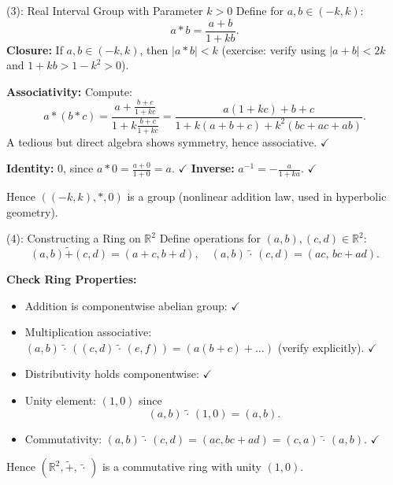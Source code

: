 \documentclass[11pt,aspectratio=43,ignorenonframetext,t]{beamer}
\begin{document}
\begin{frame}{(3): Real Interval Group with Parameter $k>0$}
Define for $a,b\in(-k,k)$:
\[
a*b=\frac{a+b}{1+kb}.
\]
\textbf{Closure:}
If $a,b\in(-k,k)$, then $|a*b|<k$ (exercise: verify using $|a+b|<2k$ and $1+kb>1-k^2>0$).

\textbf{Associativity:}  
Compute:
\[
a*(b*c)=\frac{a+\frac{b+c}{1+kc}}{1+k\frac{b+c}{1+kc}}=\frac{a(1+kc)+b+c}{1+k(a+b+c)+k^2(bc+ac+ab)}.
\]
A tedious but direct algebra shows symmetry, hence associative. $\checkmark$

\textbf{Identity:} $0$, since $a*0=\frac{a+0}{1+0}=a$. $\checkmark$  
\textbf{Inverse:} $a^{-1}=-\frac{a}{1+ka}$. $\checkmark$

Hence \(((-k,k),*,0)\) is a group (nonlinear addition law, used in hyperbolic geometry).
\end{frame}

\begin{frame}{(4): Constructing a Ring on $\mathbb{R}^2$}
Define operations for $(a,b),(c,d)\in\mathbb{R}^2$:
\[
(a,b)\tilde{+}(c,d)=(a+c,b+d),\quad
(a,b)\, \tilde{\cdot}\, (c,d)=(ac,\,bc+ad).
\]

\textbf{Check Ring Properties:}
\begin{itemize}
  \item Addition is componentwise abelian group: $\checkmark$
  \item Multiplication associative:  
    \((a,b)\, \tilde{\cdot}\, ((c,d)\, \tilde{\cdot}\, (e,f)) = (a(b+c)+\dots)\) (verify explicitly). $\checkmark$
  \item Distributivity holds componentwise: $\checkmark$
  \item Unity element: $(1,0)$ since
  \[
  (a,b)\, \tilde{\cdot}\, (1,0)=(a,b).
  \]
  \item Commutativity:  
  \((a,b)\, \tilde{\cdot}\, (c,d)=(ac,bc+ad)=(c,a)\, \tilde{\cdot}\, (a,b)\). $\checkmark$
\end{itemize}
Hence $(\mathbb{R}^2,\tilde{+},\, \tilde{\cdot}\, )$ is a commutative ring with unity $(1,0)$.
\end{frame}
\end{document}
